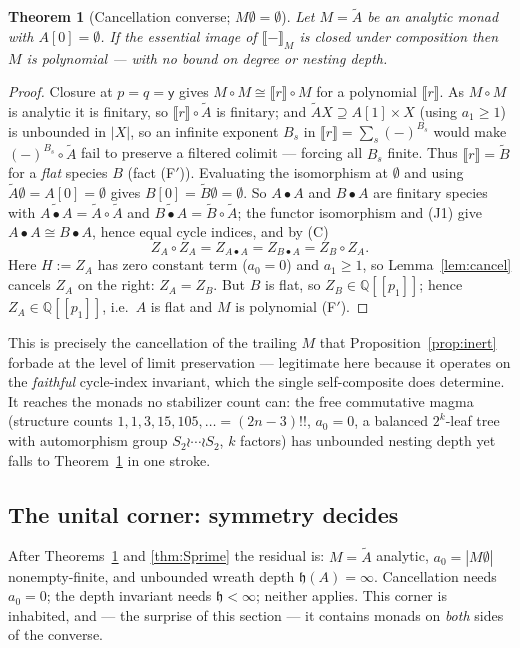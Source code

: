 \documentclass[11pt]{amsart}
\theoremstyle{plain}
\newtheorem{theorem}{Theorem}[section]
\theoremstyle{definition}
\newcommand{\ext}[1]{\llbracket #1 \rrbracket}
\newcommand{\extM}[1]{\llbracket #1 \rrbracket_{M}}
\newcommand{\y}{\mathsf{y}}
\begin{document}
\begin{theorem}[Cancellation converse; $M\emptyset=\emptyset$]\label{thm:P}
Let $M=\tilde A$ be an analytic monad with $A[0]=\emptyset$. If the essential image of $\extM{-}$ is
closed under composition then $M$ is polynomial --- with no bound on degree or nesting depth.
\end{theorem}

\begin{proof}
Closure at $p=q=\y$ gives $M\circ M\cong\ext r\circ M$ for a polynomial $\ext r$. As $M\circ M$ is
analytic it is finitary, so $\ext r\circ\tilde A$ is finitary; and $\tilde AX\supseteq A[1]\times X$
(using $a_1\ge1$) is unbounded in $|X|$, so an infinite exponent $B_s$ in $\ext r=\sum_s(-)^{B_s}$
would make $(-)^{B_s}\circ\tilde A$ fail to preserve a filtered colimit --- forcing all $B_s$ finite.
Thus $\ext r=\tilde B$ for a \emph{flat} species $B$ (fact (F$'$)). Evaluating the isomorphism at $\emptyset$ and using $\tilde A\emptyset=A[0]=\emptyset$ gives
$B[0]=\tilde B\emptyset=\emptyset$. So $A\bullet A$ and $B\bullet A$ are finitary species with
$\widetilde{A\bullet A}=\tilde A\circ\tilde A$ and $\widetilde{B\bullet A}=\tilde B\circ\tilde A$; the
functor isomorphism and (J1) give $A\bullet A\cong B\bullet A$, hence equal cycle indices, and by (C)
\[
  Z_A\circ Z_A=Z_{A\bullet A}=Z_{B\bullet A}=Z_B\circ Z_A.
\]
Here $H:=Z_A$ has zero constant term ($a_0=0$) and $a_1\ge1$, so Lemma~\ref{lem:cancel} cancels $Z_A$
on the right: $Z_A=Z_B$. But $B$ is flat, so $Z_B\in\mathbb Q[[p_1]]$; hence $Z_A\in\mathbb Q[[p_1]]$,
i.e.\ $A$ is flat and $M$ is polynomial (F$'$).
\end{proof}

This is precisely the cancellation of the trailing $M$ that Proposition~\ref{prop:inert} forbade at the
level of limit preservation --- legitimate here because it operates on the \emph{faithful} cycle-index
invariant, which the single self-composite does determine. It reaches the monads no stabilizer count
can: the free commutative magma (structure counts $1,1,3,15,105,\dots=(2n-3)!!$, $a_0=0$, a balanced
$2^k$-leaf tree with automorphism group $S_2\wr\cdots\wr S_2$, $k$ factors) has unbounded nesting depth
yet falls to Theorem~\ref{thm:P} in one stroke.

\subsection{The unital corner: symmetry decides}\label{sec:unital}
After Theorems~\ref{thm:P} and \ref{thm:Sprime} the residual is: $M=\tilde A$ analytic, $a_0=|M\emptyset|$
nonempty-finite, and unbounded wreath depth $\mathfrak h(A)=\infty$. Cancellation needs $a_0=0$; the depth
invariant needs $\mathfrak h<\infty$; neither applies. This corner is inhabited, and --- the surprise of
this section --- it contains monads on \emph{both} sides of the converse.
\end{document}
